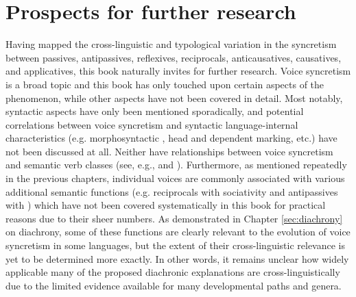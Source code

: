 \section{Prospects for further research} \label{conclusion:future}
Having mapped the cross-linguistic and typological variation in the syncretism between passives, antipassives, reflexives, reciprocals, anticausatives, causatives, and applicatives, this book naturally invites for further research. Voice syncretism is a broad topic and this book has only touched upon certain aspects of the phenomenon, while other aspects have not been covered in detail. Most notably, syntactic aspects have only been mentioned sporadically, and potential correlations between voice syncretism and syntactic language-internal characteristics (e.g. morphosyntactic , head and dependent marking, etc.) have not been discussed at all. Neither have relationships between voice syncretism and semantic verb classes (see, e.g., \citealt{malchukov:2015} and \citealt{wichmann:2015}). Furthermore, as mentioned repeatedly in the previous chapters, individual voices are commonly associated with various additional semantic functions (e.g. reciprocals with sociativity and antipassives with ) which have not been covered systematically in this book for practical reasons due to their sheer numbers. As demonstrated in Chapter \ref{sec:diachrony} on diachrony, some of these functions are clearly relevant to the evolution of voice syncretism in some languages, but the extent of their cross-linguistic relevance is yet to be determined more exactly. In other words, it remains unclear how widely applicable many of the proposed diachronic explanations are cross-linguistically due to the limited evidence available for many developmental paths and genera. 

